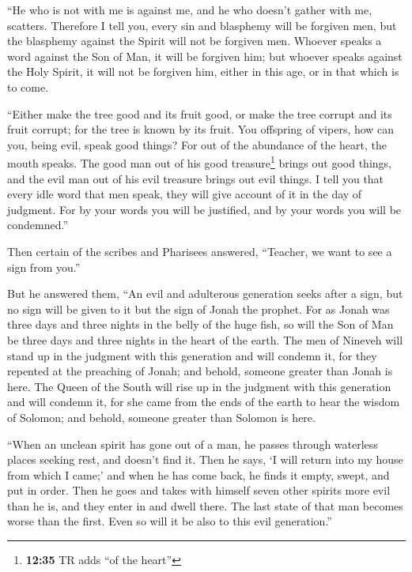  ``He who is not with me is against me, and he who
doesn't gather with me, scatters.  Therefore I tell you,
every sin and blasphemy will be forgiven men, but the blasphemy against
the Spirit will not be forgiven men.  Whoever speaks a
word against the Son of Man, it will be forgiven him; but whoever speaks
against the Holy Spirit, it will not be forgiven him, either in this
age, or in that which is to come.

 ``Either make the tree good and its fruit good, or make
the tree corrupt and its fruit corrupt; for the tree is known by its
fruit.  You offspring of vipers, how can you, being evil,
speak good things? For out of the abundance of the heart, the mouth
speaks.  The good man out of his good treasure\footnote{\textbf{12:35}
  TR adds ``of the heart''} brings out good things, and the evil man out
of his evil treasure brings out evil things.  I tell you
that every idle word that men speak, they will give account of it in the
day of judgment.  For by your words you will be
justified, and by your words you will be condemned.''

 Then certain of the scribes and Pharisees answered,
``Teacher, we want to see a sign from you.''

 But he answered them, ``An evil and adulterous
generation seeks after a sign, but no sign will be given to it but the
sign of Jonah the prophet.  For as Jonah was three days
and three nights in the belly of the huge fish, so will the Son of Man
be three days and three nights in the heart of the earth.
 The men of Nineveh will stand up in the judgment with
this generation and will condemn it, for they repented at the preaching
of Jonah; and behold, someone greater than Jonah is here.
 The Queen of the South will rise up in the judgment with
this generation and will condemn it, for she came from the ends of the
earth to hear the wisdom of Solomon; and behold, someone greater than
Solomon is here.

 ``When an unclean spirit has gone out of a man, he
passes through waterless places seeking rest, and doesn't find it.
 Then he says, `I will return into my house from which I
came;' and when he has come back, he finds it empty, swept, and put in
order.  Then he goes and takes with himself seven other
spirits more evil than he is, and they enter in and dwell there. The
last state of that man becomes worse than the first. Even so will it be
also to this evil generation.''

